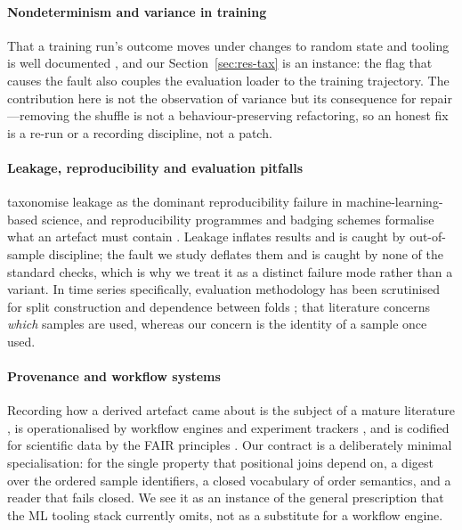 \documentclass[a4paper,fleqn]{cas-sc}
\begin{document}
\paragraph{Nondeterminism and variance in training}
That a training run's outcome moves under changes to random state and tooling is
well documented \citep{pham2020,zhuang2022}, and our
Section~\ref{sec:res-tax} is an instance: the flag that causes the fault also
couples the evaluation loader to the training trajectory. The contribution here is
not the observation of variance but its consequence for repair---removing the
shuffle is not a behaviour-preserving refactoring, so an honest fix is a re-run or
a recording discipline, not a patch.

\paragraph{Leakage, reproducibility and evaluation pitfalls}
\citet{kapoor2023} taxonomise leakage as the dominant reproducibility failure in
machine-learning-based science, and reproducibility programmes and badging schemes
formalise what an artefact must contain \citep{pineau2021,gundersen2018,acmbadging}.
Leakage inflates results and is caught by out-of-sample discipline; the fault we
study deflates them and is caught by none of the standard checks, which is why we
treat it as a distinct failure mode rather than a variant. In time series
specifically, evaluation methodology has been scrutinised for split construction
and dependence between folds \citep{bergmeir2012,hyndman2006,makridakis2020m4};
that literature concerns \emph{which} samples are used, whereas our concern is the
identity of a sample once used.

\paragraph{Provenance and workflow systems}
Recording how a derived artefact came about is the subject of a mature literature
\citep{cheney2009,herschel2017}, is operationalised by workflow engines
\citep{ditommaso2017,koster2012} and experiment trackers
\citep{zaharia2018mlflow}, and is codified for scientific data by the FAIR
principles \citep{wilkinson2016}. Our contract is a deliberately minimal
specialisation: for the single property that positional joins depend on, a digest
over the ordered sample identifiers, a closed vocabulary of order semantics, and a
reader that fails closed. We see it as an instance of the general prescription that
the ML tooling stack currently omits, not as a substitute for a workflow engine.
\end{document}
